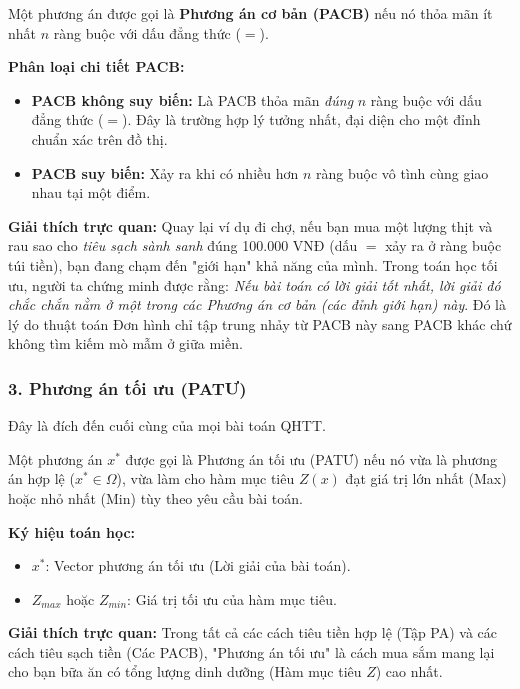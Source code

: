 \begin{definition}
Một phương án được gọi là \textbf{Phương án cơ bản (PACB)} nếu nó thỏa mãn ít nhất $n$ ràng buộc với dấu đẳng thức ($=$).
\end{definition}

\textbf{Phân loại chi tiết PACB:}
\begin{itemize}
    \item \textbf{PACB không suy biến:} Là PACB thỏa mãn \textit{đúng} $n$ ràng buộc với dấu đẳng thức ($=$). Đây là trường hợp lý tưởng nhất, đại diện cho một đỉnh chuẩn xác trên đồ thị.
    \item \textbf{PACB suy biến:} Xảy ra khi có nhiều hơn $n$ ràng buộc vô tình cùng giao nhau tại một điểm.
\end{itemize}

\textbf{Giải thích trực quan:} 
Quay lại ví dụ đi chợ, nếu bạn mua một lượng thịt và rau sao cho \textit{tiêu sạch sành sanh} đúng 100.000 VNĐ (dấu $=$ xảy ra ở ràng buộc túi tiền), bạn đang chạm đến "giới hạn" khả năng của mình. Trong toán học tối ưu, người ta chứng minh được rằng: \textit{Nếu bài toán có lời giải tốt nhất, lời giải đó chắc chắn nằm ở một trong các Phương án cơ bản (các đỉnh giới hạn) này}. Đó là lý do thuật toán Đơn hình chỉ tập trung nhảy từ PACB này sang PACB khác chứ không tìm kiếm mò mẫm ở giữa miền.

\subsubsection{3. Phương án tối ưu (PATƯ)}
Đây là đích đến cuối cùng của mọi bài toán QHTT.

\begin{definition}
Một phương án $x^*$ được gọi là Phương án tối ưu (PATƯ) nếu nó vừa là phương án hợp lệ ($x^* \in \Omega$), vừa làm cho hàm mục tiêu $Z(x)$ đạt giá trị lớn nhất (Max) hoặc nhỏ nhất (Min) tùy theo yêu cầu bài toán.
\end{definition}

\textbf{Ký hiệu toán học:}
\begin{itemize}
    \item $x^*$: Vector phương án tối ưu (Lời giải của bài toán).
    \item $Z_{max}$ hoặc $Z_{min}$: Giá trị tối ưu của hàm mục tiêu.
\end{itemize}

\textbf{Giải thích trực quan:} 
Trong tất cả các cách tiêu tiền hợp lệ (Tập PA) và các cách tiêu sạch tiền (Các PACB), "Phương án tối ưu" là cách mua sắm mang lại cho bạn bữa ăn có tổng lượng dinh dưỡng (Hàm mục tiêu $Z$) cao nhất.

